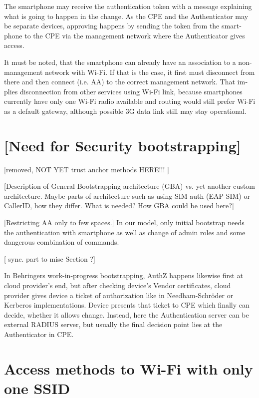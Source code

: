 \documentclass[12pt,a4paper,english]{tutthesis}
\begin{document}
\begin{otherlanguage}{english}
The smartphone may receive the authentication token with 
a message explaining what is going to happen in the change.
As the CPE and the Authenticator may be separate devices, approving
happens by sending the token from the smartphone to the CPE via the
management network where the Authenticator gives access.

It must be noted, that the smartphone can already have an association
to a non-management network with Wi-Fi. If that is the case, it first
must disconnect from there and then connect (i.e. AA) to the correct management
network. That implies disconnection from other services using Wi-Fi
link, because smartphones currently have only one Wi-Fi radio
available and routing would still prefer Wi-Fi as a default gateway, although
possible 3G data link still may stay operational.



\section{[Need for Security bootstrapping]}
\label{sec-4-4}
[removed, NOT YET trust anchor methods HERE!!! ]





[Description of General Bootstrapping architecture (GBA) vs. yet
another custom architecture. Maybe parts of architecture
such as using SIM-auth (EAP-SIM) or CallerID, how they differ. 
What is needed? How GBA could be used here?]

[Restricting AA only to few spaces.]
In our model, only initial bootstrap needs the authentication with
smartphone as well as change of admin roles and some dangerous
combination of commands.

[ sync. part to misc Section ?]


In Behringers work-in-progress  bootstrapping\cite{draft-behringer-bootstrap},
AuthZ happens likewise first at cloud provider's
end, but after checking device's Vendor certificates, cloud provider
gives device a ticket of authorization like in Needham-Schröder or
Kerberos implementations. Device presents that ticket to CPE which
finally can decide, whether it allows change. 
Instead, here the Authentication server can be external RADIUS server,
but usually the final decision point lies at the Authenticator in CPE.


\section{Access methods to Wi-Fi with only one SSID}
\label{sec-4-5}


\end{otherlanguage}
\end{document}
